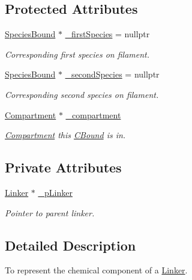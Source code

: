 \subsection*{Protected Attributes}
\begin{DoxyCompactItemize}
\item 
\hyperlink{classSpeciesBound}{Species\+Bound} $\ast$ \hyperlink{classCBound_a7ee4f44fd39c414be1f7b74b1031c1ce}{\+\_\+first\+Species} = nullptr
\begin{DoxyCompactList}\small\item\em Corresponding first species on filament. \end{DoxyCompactList}\item 
\hyperlink{classSpeciesBound}{Species\+Bound} $\ast$ \hyperlink{classCBound_ae6818ab861d273598a2507be75183e41}{\+\_\+second\+Species} = nullptr
\begin{DoxyCompactList}\small\item\em Corresponding second species on filament. \end{DoxyCompactList}\item 
\hyperlink{classCompartment}{Compartment} $\ast$ \hyperlink{classCBound_a95a66719b898cf32e60ae7137186bbbf}{\+\_\+compartment}
\begin{DoxyCompactList}\small\item\em \hyperlink{classCompartment}{Compartment} this \hyperlink{classCBound}{C\+Bound} is in. \end{DoxyCompactList}\end{DoxyCompactItemize}
\subsection*{Private Attributes}
\begin{DoxyCompactItemize}
\item 
\hyperlink{classLinker}{Linker} $\ast$ \hyperlink{classCLinker_a5cb1a9ff49e6d394ab980ff01af23ebc}{\+\_\+p\+Linker}
\begin{DoxyCompactList}\small\item\em Pointer to parent linker. \end{DoxyCompactList}\end{DoxyCompactItemize}


\subsection{Detailed Description}
To represent the chemical component of a \hyperlink{classLinker}{Linker}. 

